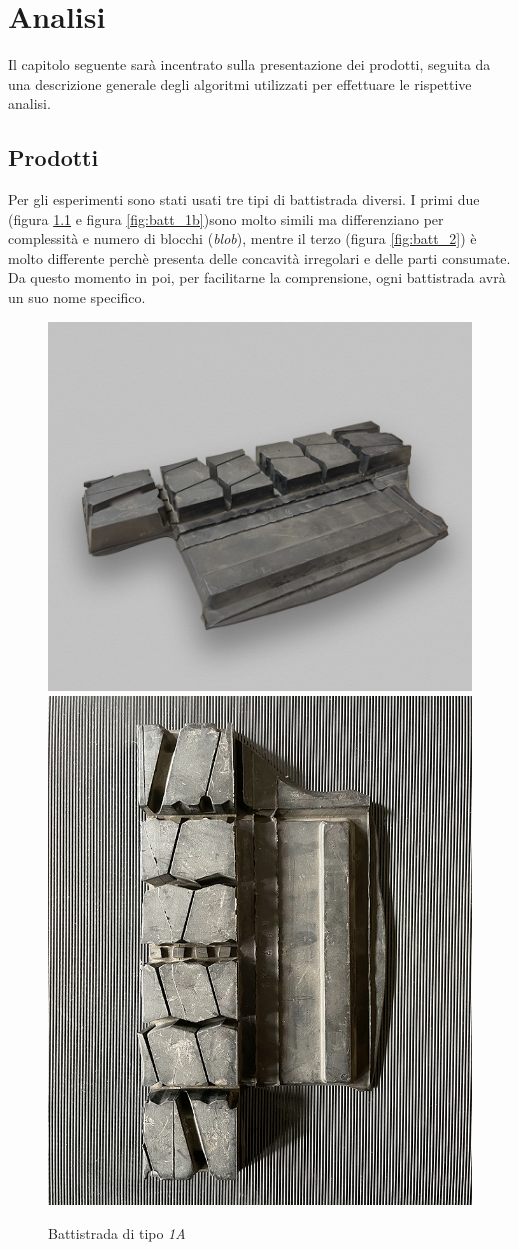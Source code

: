\chapter{Analisi}
\label{Cha:analisi}
\thispagestyle{empty}

Il capitolo seguente sarà incentrato sulla presentazione dei prodotti, seguita da una descrizione generale degli algoritmi utilizzati per effettuare le rispettive analisi.

\section{Prodotti}
Per gli esperimenti sono stati usati tre tipi di battistrada diversi. I primi due (figura \ref{fig:batt_1a} e figura \ref{fig:batt_1b})sono molto simili ma differenziano per complessità e numero di blocchi (\textit{blob}), mentre il terzo (figura \ref{fig:batt_2}) è molto differente perchè presenta delle concavità irregolari e delle parti consumate.\\
Da questo momento in poi, per facilitarne la comprensione, ogni battistrada avrà un suo nome specifico.\\

\begin{figure}[H]
	\centering
	\includegraphics[height=0.41\columnwidth]{./pictures/batt_1a_1.png}
	\includegraphics[height=0.41\columnwidth]{./pictures/batt_1a_2.png}
	\caption{Battistrada di tipo \textit{1A}}\label{fig:batt_1a}
\end{figure}

